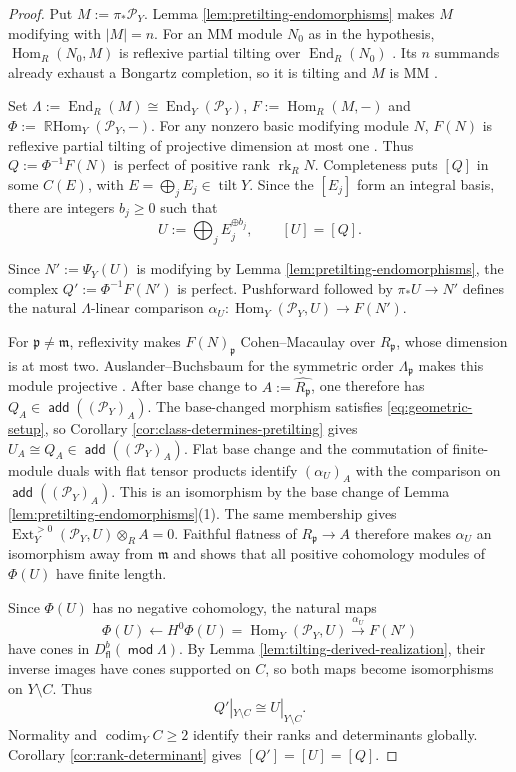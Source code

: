 \documentclass[a4paper,reqno]{amsart}
\def\P{\mathcal{P}}
\def\m{\mathfrak{m}}
\DeclareMathOperator{\md}{\mathsf{mod}}
\renewcommand{\mod}{\md}
\DeclareMathOperator{\fl}{\mathsf{fl}}
\DeclareMathOperator{\add}{\mathsf{add}}
\DeclareMathOperator{\Hom}{Hom}
\DeclareMathOperator{\End}{End}
\DeclareMathOperator{\Ext}{Ext}
\DeclareMathOperator{\RHom}{\mathbb{R}Hom}
\DeclareMathOperator{\tilt}{tilt}
\DeclareMathOperator{\rk}{rk}
\theoremstyle{definition}
\begin{document}
\begin{proof}
Put $M:=\pi_*\P_Y$. Lemma \ref{lem:pretilting-endomorphisms} makes $M$ modifying with $|M|=n$. For an MM module $N_0$ as in the hypothesis, $\Hom_R(N_0,M)$ is reflexive partial tilting over $\End_R(N_0)$ \cite[Theorem 4.17]{IW}. Its $n$ summands already exhaust a Bongartz completion, so it is tilting and $M$ is MM \cite[Lemma 4.13 and Theorem 4.17]{IW}.

Set $\Lambda:=\End_R(M)\cong\End_Y(\P_Y)$, $F:=\Hom_R(M,-)$ and $\Phi:=\RHom_Y(\P_Y,-)$. For any nonzero basic modifying module $N$, $F(N)$ is reflexive partial tilting of projective dimension at most one \cite[Theorem 4.17]{IW}. Thus $Q:=\Phi^{-1}F(N)$ is perfect of positive rank $\rk_R N$. Completeness puts $[Q]$ in some $C(E)$, with $E=\bigoplus_jE_j\in\tilt Y$. Since the $[E_j]$ form an integral basis, there are integers $b_j\ge0$ such that
\begin{equation}\label{eq:complete-fan-realization-class}
U:=\bigoplus_jE_j^{\oplus b_j},\qquad [U]=[Q].
\end{equation}

Since $N':=\Psi_Y(U)$ is modifying by Lemma \ref{lem:pretilting-endomorphisms}, the complex $Q':=\Phi^{-1}F(N')$ is perfect. Pushforward followed by $\pi_*U\to N'$ defines the natural $\Lambda$-linear comparison $\alpha_U\colon\Hom_Y(\P_Y,U)\to F(N')$.

For $\mathfrak p\ne\m$, reflexivity makes $F(N)_{\mathfrak p}$ Cohen--Macaulay over $R_{\mathfrak p}$, whose dimension is at most two. Auslander--Buchsbaum for the symmetric order $\Lambda_{\mathfrak p}$ makes this module projective \cite[Lemmas 2.10 and 2.16]{IW}. After base change to $A:=\widehat{R_{\mathfrak p}}$, one therefore has $Q_A\in\add((\P_Y)_A)$. The base-changed morphism satisfies \eqref{eq:geometric-setup}, so Corollary \ref{cor:class-determines-pretilting} gives $U_A\cong Q_A\in\add((\P_Y)_A)$.
Flat base change \cite[Tag 02KH]{stacks-project} and the commutation of finite-module duals with flat tensor products identify $(\alpha_U)_A$ with the comparison on $\add((\P_Y)_A)$. This is an isomorphism by the base change of Lemma \ref{lem:pretilting-endomorphisms}(1). The same membership gives $\Ext_Y^{>0}(\P_Y,U)\otimes_R A=0$. Faithful flatness of $R_{\mathfrak p}\to A$ therefore makes $\alpha_U$ an isomorphism away from $\m$ and shows that all positive cohomology modules of $\Phi(U)$ have finite length.

Since $\Phi(U)$ has no negative cohomology, the natural maps
\[
\Phi(U)\longleftarrow H^0\Phi(U)
=\Hom_Y(\P_Y,U)\xrightarrow{\alpha_U}F(N')
\]
have cones in $D^b_{\fl}(\mod\Lambda)$. By Lemma \ref{lem:tilting-derived-realization}, their inverse images have cones supported on $C$, so both maps become isomorphisms on $Y\setminus C$. Thus
\[
Q'|_{Y\setminus C}\cong U|_{Y\setminus C}.
\]
Normality and $\operatorname{codim}_Y C\ge2$ identify their ranks and determinants globally. Corollary \ref{cor:rank-determinant} gives $[Q']=[U]=[Q]$.


\end{proof}
\end{document}
